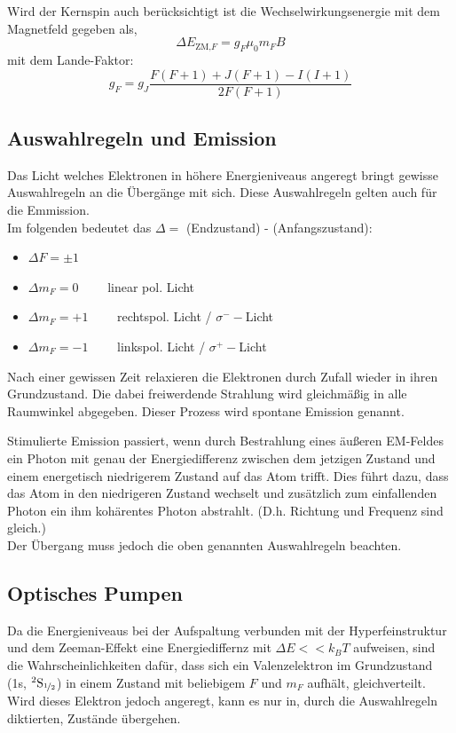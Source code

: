             Wird der Kernspin auch berücksichtigt ist die Wechselwirkungsenergie mit dem Magnetfeld gegeben als,
            \begin{equation*}
                \Delta E_{\text{ZM,}F} = g_F \mu_0 m_F B
            \end{equation*}
            mit dem Lande-Faktor:
            \begin{equation*}
                g_F = g_J \frac{F(F+1) + J(F+1) - I(I+1)}{2F(F+1)}
            \end{equation*}

    \subsection{Auswahlregeln und Emission}
        Das Licht welches Elektronen in höhere Energieniveaus angeregt bringt gewisse Auswahlregeln an die Übergänge mit sich. Diese Auswahlregeln gelten auch für die Emmission.\\
        Im folgenden bedeutet das $\Delta = $ (Endzustand) - (Anfangszustand):
        \begin{itemize}
            \item $\Delta F = \pm 1$
            \item $\Delta m_F = 0 \qquad$ linear pol. Licht
            \item $\Delta m_F = +1 \qquad$ rechtspol. Licht / $\sigma^- -$Licht
            \item $\Delta m_F = -1 \qquad$ linkspol. Licht / $\sigma^+ -$Licht
        \end{itemize}
        Nach einer gewissen Zeit relaxieren die Elektronen durch Zufall wieder in ihren Grundzustand. Die dabei freiwerdende Strahlung wird gleichmäßig in alle Raumwinkel abgegeben. Dieser Prozess wird spontane Emission genannt.

        Stimulierte Emission passiert, wenn durch Bestrahlung eines äußeren EM-Feldes ein Photon mit genau der Energiedifferenz zwischen dem jetzigen Zustand und einem energetisch niedrigerem Zustand auf das Atom trifft. Dies führt dazu, dass das Atom in den niedrigeren Zustand wechselt und zusätzlich zum einfallenden Photon ein ihm kohärentes Photon abstrahlt. (D.h. Richtung und Frequenz sind gleich.)\\
        Der Übergang muss jedoch die oben genannten Auswahlregeln beachten.

    \subsection{Optisches Pumpen}        
        Da die Energieniveaus bei der Aufspaltung verbunden mit der Hyperfeinstruktur und dem Zeeman-Effekt eine Energiediffernz mit $\Delta E << k_B T$ aufweisen, sind die Wahrscheinlichkeiten dafür, dass sich ein Valenzelektron im Grundzustand (1s, $^2\text{S}_{\nicefrac{1}{2}}$) in einem Zustand mit beliebigem $F$ und $m_F$ aufhält, gleichverteilt. Wird dieses Elektron jedoch angeregt, kann es nur in, durch die Auswahlregeln diktierten, Zustände übergehen.

